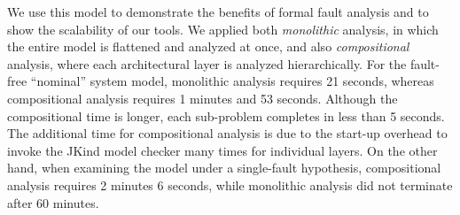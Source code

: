 

We use this model to demonstrate the benefits of formal fault analysis and to show the scalability of our tools.  We applied both {\em monolithic} analysis, in which the entire model is flattened and analyzed at once, and also {\em compositional} analysis, where each architectural layer is analyzed hierarchically.
For the fault-free ``nominal'' system model, monolithic analysis requires 21 seconds, whereas compositional analysis requires 1 minutes and 53 seconds.  Although the compositional time is longer, each sub-problem completes in less than 5 seconds.  The additional time for compositional analysis is  due to the start-up overhead to invoke the JKind model checker many times for individual layers.  On the other hand, when examining the model under a single-fault hypothesis, compositional analysis requires 2 minutes 6 seconds, while monolithic analysis did not terminate after 60 minutes.

